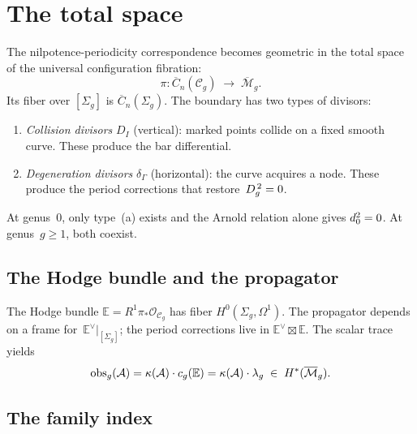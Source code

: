 \section{The total space}
\label{sec:modular-homotopy-theory}

The nilpotence-periodicity correspondence becomes geometric in the
total space of the universal configuration fibration:
\begin{equation}\label{eq:total-fibration-intro}
\pi \colon \overline{C}_n(\mathcal{C}_g) \;\longrightarrow\;
\overline{\mathcal{M}}_g.
\end{equation}
Its fiber over $[\Sigma_g]$ is $\overline{C}_n(\Sigma_g)$.  The
boundary has two types of divisors:
\begin{enumerate}[label=\textup{(\alph*)}]
\item \emph{Collision divisors} $D_I$ (vertical): marked points
  collide on a fixed smooth curve.  These produce the bar
  differential.
\item \emph{Degeneration divisors} $\delta_\Gamma$ (horizontal):
  the curve acquires a node.  These produce the period corrections
  that restore~$D_{g}^{\,2} = 0$.
\end{enumerate}
At genus~$0$, only type~(a) exists and the Arnold relation alone
gives $d_0^2 = 0$.  At genus~$g \geq 1$, both coexist.

\subsection{The Hodge bundle and the propagator}
\label{subsec:hodge-deformation-engine}

The Hodge bundle $\mathbb{E} = R^1\pi_*\mathcal{O}_{\mathcal{C}_g}$
has fiber $H^0(\Sigma_g, \Omega^1)$.  The propagator depends on a
frame for~$\mathbb{E}^\vee|_{[\Sigma_g]}$; the period corrections
live in $\mathbb{E}^\vee \boxtimes \mathbb{E}$.  The scalar trace
yields
\begin{equation}\label{eq:lambda-from-trace}
\mathrm{obs}_g(\mathcal{A})
= \kappa(\mathcal{A}) \cdot c_g(\mathbb{E})
= \kappa(\mathcal{A}) \cdot \lambda_g
\;\in\; H^*(\overline{\mathcal{M}}_g).
\end{equation}

\subsection{The family index}
\label{subsec:family-index-intro}

